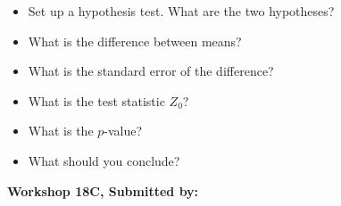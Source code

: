 \documentclass[11pt, chapterprefix=true]{scrbook}\usepackage[]{graphicx}\usepackage[]{color}
\begin{document}
\begin{exercises}
\begin{exercise}
\begin{itemize}
  \item Set up a hypothesis test. What are the two hypotheses?
  \item What is the difference between means?
  \item What is the standard error of the difference?
  \item What is the test statistic $Z_0$?
  \item What is the $p$-value?
  \item What should you conclude?
\end{itemize}

\end{exercise} 
\begin{solution}  %


\end{solution}

\clearpage

    \begin{exercise}  %



    \begin{center}
\begin{flushleft}\textbf{\large \hfill Workshop 18C, Submitted by: }\end{flushleft}

\end{center}
\end{exercise}
\end{exercises}
\end{document}
